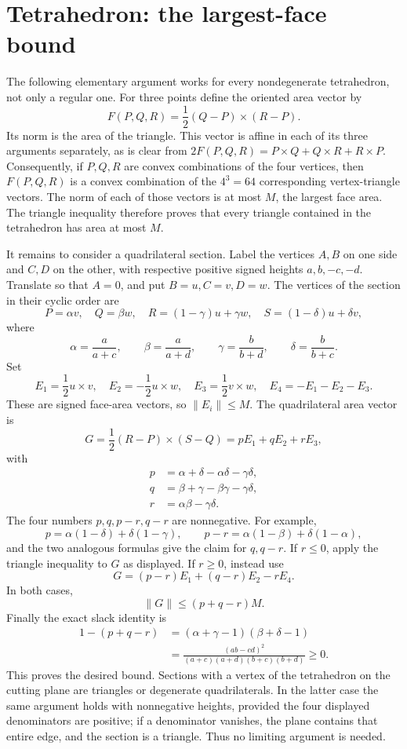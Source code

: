 \section{Tetrahedron: the largest-face bound}
The following elementary argument works for every nondegenerate tetrahedron,
not only a regular one.  For three points define the oriented area vector by
\[
 F(P,Q,R)=\frac12(Q-P)\mathbin\times(R-P).
\]
Its norm is the area of the triangle.  This vector is affine in each of
its three arguments separately, as is clear from
$2F(P,Q,R)=P\times Q+Q\times R+R\times P$.
Consequently, if $P,Q,R$ are convex combinations of the four vertices,
then $F(P,Q,R)$ is a convex combination of the $4^3=64$ corresponding
vertex-triangle vectors.  The norm of each of those vectors is at most
$M$, the largest face area.  The triangle inequality therefore proves
that every triangle contained in the tetrahedron has area at most $M$.

It remains to consider a quadrilateral section.  Label the vertices
$A,B$ on one side and $C,D$ on the other, with respective positive
signed heights $a,b,-c,-d$.  Translate so that $A=0$, and put
$B=u,C=v,D=w$.  The vertices of the section in their cyclic order are
\[
 P=\alpha v,\quad Q=\beta w,\quad
 R=(1-\gamma)u+\gamma w,\quad
 S=(1-\delta)u+\delta v,
\]
where
\[
 \alpha=\frac a{a+c},\qquad \beta=\frac a{a+d},\qquad
 \gamma=\frac b{b+d},\qquad \delta=\frac b{b+c}.
\]
Set
\[
 E_1=\frac12u\times v,\quad E_2=-\frac12u\times w,
 \quad E_3=\frac12v\times w,\quad E_4=-E_1-E_2-E_3.
\]
These are signed face-area vectors, so $\lVert E_i\rVert\le M$.
The quadrilateral area vector is
\[
 G=\frac12(R-P)\times(S-Q)=pE_1+qE_2+rE_3,
\]
with
\begin{align*}
 p&=\alpha+\delta-\alpha\delta-\gamma\delta,\\
 q&=\beta+\gamma-\beta\gamma-\gamma\delta,\\
 r&=\alpha\beta-\gamma\delta.
\end{align*}
The four numbers $p,q,p-r,q-r$ are nonnegative.  For example,
\[
 p=\alpha(1-\delta)+\delta(1-\gamma),\qquad
 p-r=\alpha(1-\beta)+\delta(1-\alpha),
\]
and the two analogous formulas give the claim for $q,q-r$.
If $r\le0$, apply the triangle inequality to $G$ as displayed.
If $r\ge0$, instead use
\[
 G=(p-r)E_1+(q-r)E_2-rE_4.
\]
In both cases,
\[
 \lVert G\rVert\le(p+q-r)M.
\]
Finally the exact slack identity is
\begin{align*}
 1-(p+q-r)
 &=(\alpha+\gamma-1)(\beta+\delta-1)\\
 &=\frac{(ab-cd)^2}{(a+c)(a+d)(b+c)(b+d)}\ge0.
\end{align*}
This proves the desired bound.  Sections with a vertex of the tetrahedron
on the cutting plane are triangles or degenerate quadrilaterals.  In
the latter case the same argument holds with nonnegative heights,
provided the four displayed denominators are positive; if a denominator
vanishes, the plane contains that entire edge, and the section is a
triangle.  Thus no limiting argument is needed.

